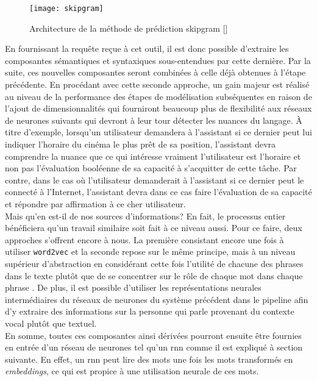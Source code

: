 \begin{figure}[ht]
  \centering
  \texttt{[image: skipgram]}
  \caption{Architecture de la méthode de prédiction \gls{skipgram} []}
  \label{fig:skipgram}
\end{figure}

En fournissant la requête reçue à cet outil, il est donc possible d'extraire les composantes sémantiques et syntaxiques sous-entendues par cette dernière. Par la suite, ces nouvelles composantes seront combinées à celle déjà obtenues à l'étape précédente. En procédant avec cette seconde approche, un gain majeur est réalisé au niveau de la performance des étapes de modélisation subséquentes en raison de l'ajout de dimensionnalités qui fourniront beaucoup plus de flexibilité aux réseaux de neurones suivants qui devront à leur tour détecter les nuances du langage. À titre d'exemple, lorsqu'un utilisateur demandera à l'assistant si ce dernier peut lui indiquer l'horaire du cinéma le plus prêt de sa position, l'assistant devra comprendre la nuance que ce qui intéresse vraiment l'utilisateur est l'horaire et non pas l'évaluation booléenne de sa capacité à s'acquitter de cette tâche. Par contre, dans le cas où l'utilisateur demanderait à l'assistant si ce dernier peut le connecté à l'Internet, l'assistant devra dans ce cas faire l'évaluation de sa capacité et répondre par affirmation à ce cher utilisateur. \\

Mais qu'en est-il de nos sources d'informations? En fait, le processus entier bénéficiera qu'un travail similaire soit fait à ce niveau aussi. Pour ce faire, deux approches s'offrent encore à nous. La première consistant encore une fois à utiliser \texttt{word2vec} et la seconde repose sur le même principe, mais à un niveau supérieur d'abstraction en considérant cette fois l'utilité de chacune des phrases dans le texte plutôt que de se concentrer sur le rôle de chaque mot dans chaque phrase \cite{inferSent}. De plus, il est possible d'utiliser les représentations neurales intermédiaires du réseaux de neurones du système précédent dans le pipeline afin d'y extraire des informations sur la personne qui parle provenant du contexte vocal plutôt que textuel. \\

En somme, toutes ces composantes ainsi dérivées pourront ensuite être fournies en entrée d'un réseau de neurones tel qu'un \gls{rnn} comme il est expliqué à section suivante. En effet, un \gls{rnn} peut lire des mots une fois les mots transformés en \textit{embeddings}, ce qui est propice à une utilisation neurale de ces mots.
